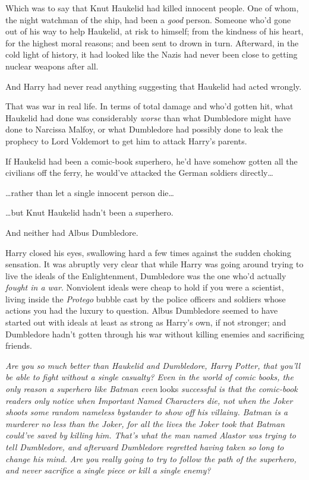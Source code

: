Which was to say that Knut Haukelid had killed innocent people. One of whom,
the night watchman of the ship, had been a \emph{good} person. Someone who'd
gone out of his way to help Haukelid, at risk to himself; from the kindness of
his heart, for the highest moral reasons; and been sent to drown in turn.
Afterward, in the cold light of history, it had looked like the Nazis had never
been close to getting nuclear weapons after all.

And Harry had never read anything suggesting that Haukelid had acted wrongly.

That was war in real life. In terms of total damage and who'd gotten hit, what
Haukelid had done was considerably \emph{worse} than what Dumbledore might have
done to Narcissa Malfoy, or what Dumbledore had possibly done to leak the
prophecy to Lord Voldemort to get him to attack Harry's parents.

If Haukelid had been a comic-book superhero, he'd have somehow gotten all the
civilians off the ferry, he would've attacked the German soldiers
directly{\ldots}

{\ldots}rather than let a single innocent person die{\ldots}

{\ldots}but Knut Haukelid hadn't been a superhero.

And neither had Albus Dumbledore.

Harry closed his eyes, swallowing hard a few times against the sudden choking
sensation. It was abruptly very clear that while Harry was going around trying
to live the ideals of the Enlightenment, Dumbledore was the one who'd actually
\emph{fought in a war}. Nonviolent ideals were cheap to hold if you were a
scientist, living inside the \emph{Protego} bubble cast by the police officers
and soldiers whose actions you had the luxury to question. Albus Dumbledore
seemed to have started out with ideals at least as strong as Harry's own, if
not stronger; and Dumbledore hadn't gotten through his war without killing
enemies and sacrificing friends.

\emph{Are you so much better than Haukelid and Dumbledore, Harry Potter, that
you'll be able to fight without a single casualty? Even in the world of comic
books, the only reason a superhero like Batman even} looks \emph{successful is
that the comic-book readers only notice when Important Named Characters die,
not when the Joker shoots some random nameless bystander to show off his
villainy. Batman is a murderer no less than the Joker, for all the lives the
Joker took that Batman could've saved by killing him. That's what the man named
Alastor was trying to tell Dumbledore, and afterward Dumbledore regretted
having taken so long to change his mind. Are you really going to try to follow
the path of the superhero, and never sacrifice a single piece or kill a single
enemy?}

